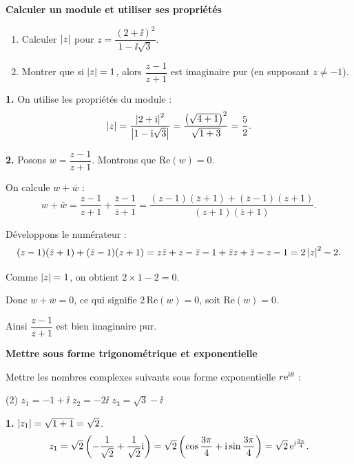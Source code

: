 \exerciceresolu
\textbf{Calculer un module et utiliser ses propriétés}

\begin{enumerate}
	\item Calculer $\left|z\right|$ pour $z = \dfrac{(2 + \ii)^2}{1 - \ii\sqrt{3}}$.

	\item Montrer que si $\left|z\right| = 1$, alors $\dfrac{z - 1}{z + 1}$ est imaginaire pur
	(en supposant $z \neq -1$).
\end{enumerate}

\solution

\textbf{1.} On utilise les propriétés du module :
$$
\left|z\right|
= \frac{\left|2 + \mathrm{i}\right|^2}{\left|1 - \mathrm{i}\sqrt{3}\right|}
= \frac{\left(\sqrt{4+1}\right)^2}{\sqrt{1 + 3}}
= \frac{5}{2}.
$$

\textbf{2.} Posons $w = \dfrac{z-1}{z+1}$. Montrons que $\mathrm{Re}(w) = 0$.

On calcule $w + \bar{w}$ :
$$
w + \bar{w} = \frac{z-1}{z+1} + \frac{\bar{z}-1}{\bar{z}+1}
= \frac{(z-1)(\bar{z}+1) + (\bar{z}-1)(z+1)}{(z+1)(\bar{z}+1)}.
$$

Développons le numérateur :
$$
(z-1)(\bar{z}+1) + (\bar{z}-1)(z+1)
= z\bar{z} + z - \bar{z} - 1 + \bar{z}z + \bar{z} - z - 1
= 2\left|z\right|^2 - 2.
$$

Comme $\left|z\right| = 1$, on obtient $2 \times 1 - 2 = 0$.

Donc $w + \bar{w} = 0$, ce qui signifie $2\,\mathrm{Re}(w) = 0$, soit $\mathrm{Re}(w) = 0$.

Ainsi $\dfrac{z-1}{z+1}$ est bien imaginaire pur.



\exerciceresolu
\textbf{Mettre sous forme trigonométrique et exponentielle}

Mettre les nombres complexes suivants sous forme exponentielle $r\mathrm{e}^{\mathrm{i}\theta}$ :
\begin{listecol}(2)
	\task $z_1 = -1 + \ii$
	\task $z_2 = -2\ii$
	\task $z_3 = \sqrt{3} - \ii$
\end{listecol}

\solution

\textbf{1.} $\left|z_1\right| = \sqrt{1+1} = \sqrt{2}$.
$$
z_1 = \sqrt{2}\left(-\frac{1}{\sqrt{2}} + \frac{1}{\sqrt{2}}\mathrm{i}\right)
= \sqrt{2}\left(\cos\frac{3\pi}{4} + \mathrm{i}\sin\frac{3\pi}{4}\right)
= \sqrt{2}\,\mathrm{e}^{\mathrm{i}\frac{3\pi}{4}}.
$$

